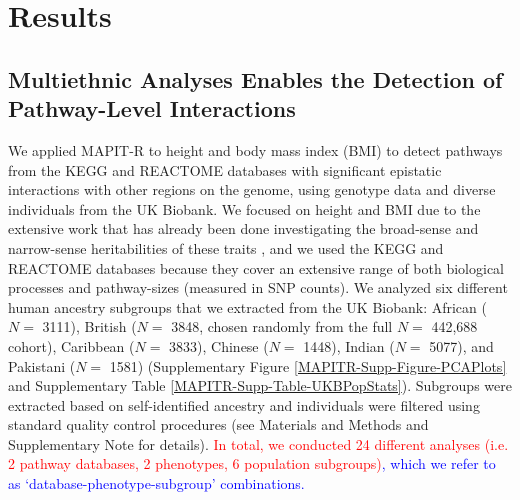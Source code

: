 \documentclass[10pt]{article}
\begin{document}

\section*{Results}\label{MAPITR-Results}

\subsection*{Multiethnic Analyses Enables the Detection of Pathway-Level Interactions}\label{MAPITR-Results-PathwayEpistasis}

We applied MAPIT-R to height and body mass index (BMI) to detect pathways from the KEGG and REACTOME databases \cite{Liberzon2011} with significant epistatic interactions with other regions on the genome, using genotype data and diverse individuals from the UK Biobank. We focused on height and BMI due to the extensive work that has already been done investigating the broad-sense and narrow-sense heritabilities of these traits \cite{Yang2010,Elks2012,Visscher2012,Finucane2015,Speed2017,Wainschtein2019}, and we used the KEGG and REACTOME databases because they cover an extensive range of both biological processes and pathway-sizes (measured in SNP counts). We analyzed six different human ancestry subgroups that we extracted from the UK Biobank: African ($N=$ 3111), British ($N=$ 3848, chosen randomly from the full $N=$ 442,688 cohort), Caribbean ($N=$ 3833), Chinese ($N=$ 1448), Indian ($N=$ 5077), and Pakistani ($N=$ 1581) (Supplementary Figure \ref{MAPITR-Supp-Figure-PCAPlots} and Supplementary Table \ref{MAPITR-Supp-Table-UKBPopStats}). Subgroups were extracted based on self-identified ancestry and individuals were filtered using standard quality control procedures (see Materials and Methods and Supplementary Note for details). \textcolor{red}{In total, we conducted 24 different analyses (i.e. 2 pathway databases, 2 phenotypes, 6 population subgroups)}\textcolor{blue}{, which we refer to as `database-phenotype-subgroup' combinations.}
\end{document}
